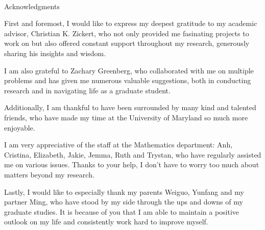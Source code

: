 

\renewcommand{\baselinestretch}{2}
\small\normalsize
\hbox{\ }

\vspace{-.65in}

\begin{center}
\large{Acknowledgments}
\end{center}

\vspace{1ex}


First and foremost, I would like to express my deepest gratitude to my academic advisor, Christian K. Zickert, who not only provided me fasinating projects to work on but also offered constant support throughout my research, generously sharing his insights and wisdom.

I am also grateful to Zachary Greenberg, who collaborated with me on multiple problems and has given me numerous valuable suggestions, both in conducting research and in navigating life as a graduate student.

Additionally, I am thankful to have been surrounded by many kind and talented friends, who have made my time at the University of Maryland so much more enjoyable.

I am very appreciative of the staff at the Mathematics department: Anh, Cristina, Elizabeth, Jakie, Jemma, Ruth and Trystan, who have regularly assisted me on various issues. Thanks to your help, I don't have to worry too much about matters beyond my research.

Lastly, I would like to especially thank my parents Weiguo, Yunfang and my partner Ming, who have stood by my side through the ups and downs of my graduate studies. It is because of you that I am able to maintain a positive outlook on my life and consistently work hard to improve myself.